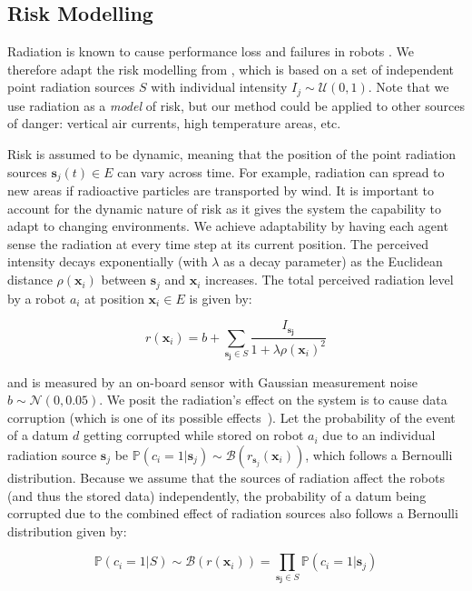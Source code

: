 \documentclass[sigconf]{aamas}
\begin{document}
\subsection{Risk Modelling}
Radiation is known to cause performance loss and failures in robots \cite{sharp1996radiation,messenger1986effects}. We therefore adapt the risk modelling from \cite{vielfaure2021dora}, which is based on a set of independent point radiation sources $S$ with individual intensity $I_j\sim\mathcal{U}(0, 1)$. Note that we use radiation as
a \emph{model} of risk, but our method could be applied to other sources of danger:
vertical air currents, high temperature areas, etc.

Risk is assumed to be dynamic, meaning that the position of the point radiation sources $\bm{s}_j(t) \in E$ can vary across time. 
For example, radiation can spread to new areas if radioactive particles are
transported by wind. It is important to account for the dynamic nature of risk as it gives 
the system the capability to adapt to changing environments. We achieve adaptability by 
having each agent sense the radiation at every time step at its current position. The 
perceived intensity decays exponentially (with $\lambda$ as a decay parameter) as the 
Euclidean distance $\rho(\bm{x}_i)$ between $\bm{s}_j$ and $\bm{x}_i$ increases. The
total perceived radiation level by a robot $a_i$ at position $\bm{x}_i \in E$ is given by:

\begin{equation}
    r(\bm{x}_i) = b + \sum_{\bm{s_j} \in S} \frac{I_{\bm{s_j}}}{1 + \lambda\rho(\bm{x}_i)^2}
    \label{eq:radiation}
\end{equation}

and is measured by an on-board sensor with Gaussian measurement noise
$b \sim \mathcal{N}(0, 0.05)$. We posit the radiation's effect on the system is to cause 
data corruption (which is one of its possible effects~\cite{messenger1986effects}). Let the 
probability of the event of a datum $d$ getting corrupted while stored on robot $a_i$ due 
to an individual radiation  source $\bm{s}_j$ be
$\mathbb{P}(c_i = 1 | \bm{s}_j) \sim
\mathcal{B}(r_{\bm{s}_j}(\bm{x}_i))$, which follows a Bernoulli
distribution. Because we assume that the sources of radiation affect
the robots (and thus the stored data) independently, the probability of a datum being 
corrupted due to the combined effect of radiation sources also follows a Bernoulli 
distribution given by:

\begin{equation}
    \mathbb{P}(c_i = 1 | S) \sim \mathcal{B}(r(\bm{x}_i)) = \prod_{\bm{s_j} \in S} \mathbb{P}(c_i = 1 | \bm{s}_j)
    \label{eq:failure}
\end{equation}
\end{document}
